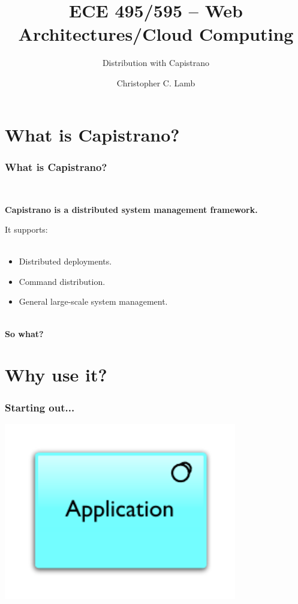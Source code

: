 \documentclass[t,handout]{beamer}
\title{ECE 495/595 -- Web Architectures/Cloud Computing}
\subtitle{Distribution with Capistrano}
\author[\copyright \ 2012 C. C. Lamb]{Christopher C. Lamb}
\date{}
\institute[University of New Mexico]{\large University of New Mexico}
\begin{document}
\begin{frame}
\titlepage
\end{frame}



\section{What is Capistrano?}
\begin{frame}
\frametitle{What is Capistrano?}
~\\
\begin{center}
{\bf Capistrano is a distributed system management framework.} \\
\end{center}
It supports: \\
~\\
\begin{small}
\begin{itemize}
\item Distributed deployments.
\item Command distribution.
\item General large-scale system management.
\end{itemize}
\end{small}
\begin{center}
~\\
{\bf So what?}
\end{center}
\end{frame}

\section{Why use it?}
\begin{frame}
\frametitle{Starting out...}
\includegraphics[width = 4in]{cap-app.pdf}
\transfade
\end{frame}
\end{document}
